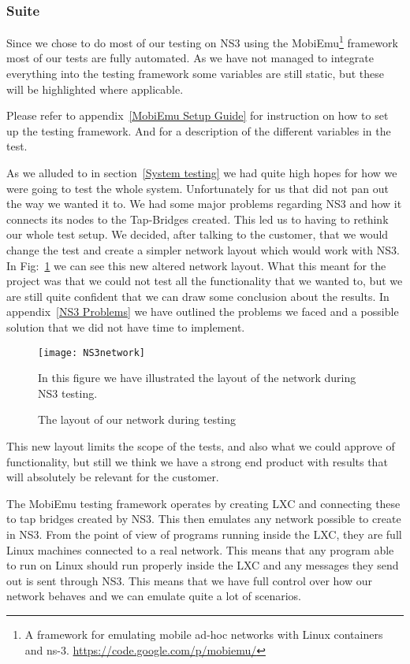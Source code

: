 \subsubsection{Suite}\label{Testing:About:Suite}
	Since we chose to do most of our testing on NS3 using the MobiEmu\footnote{A framework for emulating mobile ad-hoc networks with Linux containers and ns-3. \url{https://code.google.com/p/mobiemu/}} framework most of our tests are fully automated. As we have not managed to integrate everything into the testing framework some variables are still static, but these will be highlighted where applicable.

	\begin{shaded}
	Please refer to appendix~\ref{MobiEmu Setup Guide} for instruction on how to set up the testing framework. And for a description of the different variables in the test.
	\end{shaded}
	
	As we alluded to in section~\ref{System testing} we had quite high hopes for how we were going to test the whole system. Unfortunately for us that did not pan out the way we wanted it to. We had some major problems regarding NS3 and how it connects its nodes to the Tap-Bridges created. This led us to having to rethink our whole test setup. We decided, after talking to the customer, that we would change the test and create a simpler network layout which would work with NS3. In Fig:~\ref{fig:NS3network} we can see this new altered network layout. What this meant for the project was that we could not test all the functionality that we wanted to, but we are still quite confident that we can draw some conclusion about the results. In appendix~\ref{NS3 Problems} we have outlined the problems we faced and a possible solution that we did not have time to implement.
	
	\begin{figure}[H]
        \centering
        \texttt{[image: NS3network]}
        \caption{The layout of our network during testing}
        In this figure we have illustrated the layout of the network during NS3 testing.
        \label{fig:NS3network}
    \end{figure}
    
    This new layout limits the scope of the tests, and also what we could approve of functionality, but still we think we have a strong end product with results that will absolutely be relevant for the customer.
    
    The MobiEmu testing framework operates by creating \gls{LXC} and connecting these to tap bridges created by NS3. This then emulates any network possible to create in NS3. From the point of view of programs running inside the LXC, they are full Linux machines connected to a real network. This means that any program able to run on Linux should run properly inside the LXC and any messages they send out is sent through NS3. This means that we have full control over how our network behaves and we can emulate quite a lot of scenarios.
    
